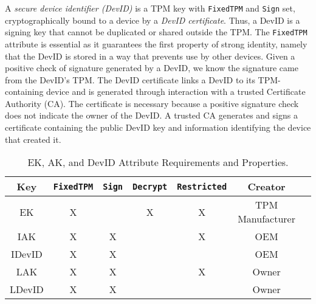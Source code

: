 \documentclass[runningheads]{llncs}
\begin{document}

A \emph{secure device identifier (DevID)} is a TPM key with
\verb|FixedTPM| and \verb|Sign| set, cryptographically bound to a
device by a \emph{DevID certificate}.  Thus, a DevID is a signing key that
cannot be duplicated or shared outside the TPM.  
The \verb|FixedTPM| attribute is essential as it guarantees the first property of
strong identity, namely that the DevID is stored in a way that prevents use by other
devices. Given a positive check of signature generated by a DevID, we know the signature
came from the DevID's TPM.
The DevID certificate links a DevID to its TPM-containing device and is generated through
interaction with a trusted Certificate Authority (CA).  The certificate is
necessary because a positive signature check does not indicate the
owner of the DevID.  A trusted CA generates and signs a certificate containing 
the public DevID key and information identifying the device that created it.

\begin{table}[hbtp]
  \begin{center}
    \footnotesize
    \begin{tabular}{ |c|c|c|c|c|c|c| }
      \hline
Key & \verb|FixedTPM| & \verb|Sign| & \verb|Decrypt| & \verb|Restricted| &
Creator \\
      \hline
      \hline
      EK & X &   & X & X & TPM Manufacturer \\
      \hline
      IAK & X & X &   & X & OEM   \\
      \hline
      IDevID & X & X &   &   & OEM   \\
      \hline
      LAK & X & X &   & X & Owner  \\
      \hline
      LDevID & X & X &   &   & Owner  \\
      \hline
    \end{tabular}
    \caption{EK, AK, and DevID Attribute Requirements and Properties.}
    \label{fig:req_and_recs}
  \end{center}
\end{table}
\end{document}
